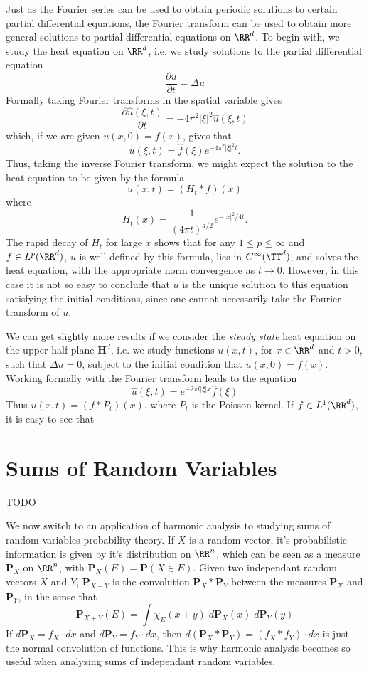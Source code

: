Just as the Fourier series can be used to obtain periodic solutions to certain partial differential equations, the Fourier transform can be used to obtain more general solutions to partial differential equations on $\RR^d$. To begin with, we study the heat equation on $\RR^d$, i.e. we study solutions to the partial differential equation
%
\[ \frac{\partial u}{\partial t} = \Delta u \]
%
Formally taking Fourier transforms in the spatial variable gives
%
\[ \frac{\partial \widehat{u}(\xi,t)}{\partial t} = - 4 \pi^2 |\xi|^2 \widehat{u}(\xi,t) \]
%
which, if we are given $u(x,0) = f(x)$, gives that
%
\[ \widehat{u}(\xi,t) = \widehat{f}(\xi) e^{- 4 \pi^2 |\xi|^2 t}. \]
%
Thus, taking the inverse Fourier transform, we might expect the solution to the heat equation to be given by the formula
%
\[ u(x,t) = (H_t * f)(x) \]
%
where
%
\[ H_t(x) = \frac{1}{(4 \pi t)^{d/2}} e^{- |x|^2 / 4 t}. \]
%
The rapid decay of $H_t$ for large $x$ shows that for any $1 \leq p \leq \infty$ and $f \in L^p(\RR^d)$, $u$ is well defined by this formula, lies in $C^\infty(\TT^d)$, and solves the heat equation, with the appropriate norm convergence as $t \to 0$. However, in this case it is not so easy to conclude that $u$ is the unique solution to this equation satisfying the initial conditions, since one cannot necessarily take the Fourier transform of $u$.

We can get slightly more results if we consider the \emph{steady state} heat equation on the upper half plane $\mathbf{H}^d$, i.e. we study functions $u(x,t)$, for $x \in \RR^d$ and $t > 0$, such that $\Delta u = 0$, subject to the initial condition that $u(x,0) = f(x)$. Working formally with the Fourier transform leads to the equation
%
\[ \widehat{u}(\xi,t) = e^{-2 \pi t |\xi| x} \widehat{f}(\xi) \]
%
Thus $u(x,t) = (f * P_t)(x)$, where $P_t$ is the Poisson kernel. If $f \in L^1(\RR^d)$, it is easy to see that 


\section{Sums of Random Variables}

TODO

We now switch to an application of harmonic analysis to studying sums of random variables probability theory. If $X$ is a random vector, it's probabilistic information is given by it's distribution on $\RR^n$, which can be seen as a measure $\mathbf{P}_X$ on $\RR^n$, with $\mathbf{P}_X(E) = \mathbf{P}(X \in E)$. Given two independant random vectors $X$ and $Y$, $\mathbf{P}_{X+Y}$ is the convolution $\mathbf{P}_X * \mathbf{P}_Y$ between the measures $\mathbf{P}_X$ and $\mathbf{P}_Y$, in the sense that
%
\[ \mathbf{P}_{X+Y}(E) = \int \chi_E(x+y)\; d\mathbf{P}_X(x)\; d\mathbf{P}_Y(y) \]
%
If $d\mathbf{P}_X = f_X \cdot dx$ and $d\mathbf{P}_Y = f_Y \cdot dx$, then $d(\mathbf{P}_X * \mathbf{P}_Y) = (f_X * f_Y) \cdot dx$ is just the normal convolution of functions. This is why harmonic analysis becomes so useful when analyzing sums of independant random variables.

